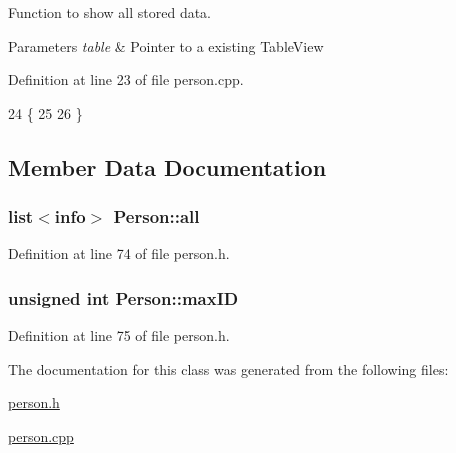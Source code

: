 Function to show all stored data. 


\begin{DoxyParams}{Parameters}
{\em table} & Pointer to a existing Table\+View \\
\hline
\end{DoxyParams}


Definition at line 23 of file person.\+cpp.


\begin{DoxyCode}
24 \{
25     
26 \}
\end{DoxyCode}


\subsection{Member Data Documentation}
\hypertarget{class_person_a23d6ff8cb8e45c9e3502baffa6a0468a}{
\subsubsection[{all}]{\setlength{\rightskip}{0pt plus 5cm}list$<${\bf info}$>$ Person\+::all\hspace{0.3cm}{\ttfamily [private]}}}\label{class_person_a23d6ff8cb8e45c9e3502baffa6a0468a}


Definition at line 74 of file person.\+h.

\hypertarget{class_person_a816ee6194426eb703b61ae267e8e8ee6}{
\subsubsection[{max\+I\+D}]{\setlength{\rightskip}{0pt plus 5cm}unsigned int Person\+::max\+I\+D\hspace{0.3cm}{\ttfamily [private]}}}\label{class_person_a816ee6194426eb703b61ae267e8e8ee6}


Definition at line 75 of file person.\+h.



The documentation for this class was generated from the following files\+:\begin{DoxyCompactItemize}
\item 
\hyperlink{person_8h}{person.\+h}\item 
\hyperlink{person_8cpp}{person.\+cpp}\end{DoxyCompactItemize}
